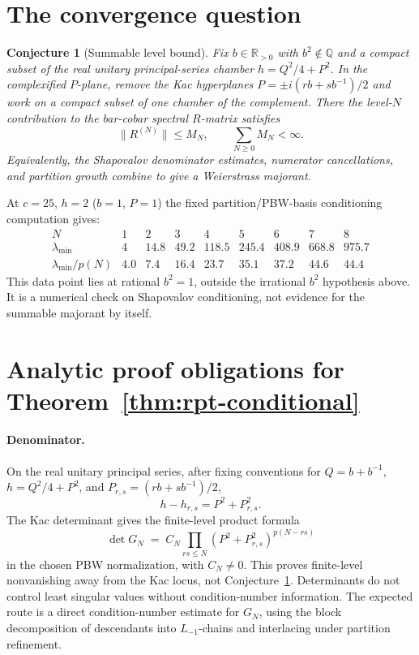 \documentclass[11pt]{amsart}
\newtheorem{conjecture}[theorem]{Conjecture}
\theoremstyle{definition}
\theoremstyle{remark}
\begin{document}
\section{The convergence question}

\begin{conjecture}[Summable level bound]
\label{conj:shapovalov-growth}
Fix $b\in\mathbb{R}_{>0}$ with $b^2\notin\mathbb{Q}$ and a compact
subset of the real unitary principal-series chamber
$h = Q^2/4 + P^2$.  In the complexified $P$-plane, remove the Kac
hyperplanes $P=\pm i(rb+s b^{-1})/2$ and work on a compact subset of
one chamber of the complement.  There the level-$N$ contribution to
the bar-cobar spectral $R$-matrix satisfies
\[
  \|R^{(N)}\| \le M_N,
  \qquad \sum_{N\ge0} M_N < \infty .
\]
Equivalently, the Shapovalov denominator estimates, numerator
cancellations, and partition growth combine to give a Weierstrass
majorant.
\end{conjecture}

At $c = 25$, $h = 2$ ($b = 1$, $P = 1$) the fixed partition/PBW-basis
conditioning computation gives:
\[
\begin{array}{c|cccccccc}
N & 1 & 2 & 3 & 4 & 5 & 6 & 7 & 8 \\
\hline
\lambda_{\min} & 4 & 14.8 & 49.2 & 118.5 & 245.4 & 408.9 & 668.8 &
975.7 \\
\lambda_{\min}/p(N) & 4.0 & 7.4 & 16.4 & 23.7 & 35.1 & 37.2 & 44.6 &
44.4
\end{array}
\]
This data point lies at rational $b^2=1$, outside the irrational
$b^2$ hypothesis above.  It is a numerical check on Shapovalov
conditioning, not evidence for the summable majorant by itself.

\section{Analytic proof obligations for Theorem~\ref{thm:rpt-conditional}}

\paragraph{Denominator.}
On the real unitary principal series, after fixing conventions for
$Q=b+b^{-1}$, $h=Q^2/4+P^2$, and
$P_{r,s}=(rb+s b^{-1})/2$,
\[
  h-h_{r,s}=P^2+P_{r,s}^2 .
\]
The Kac determinant gives the finite-level product formula
\cite{KacRaina,FeiginFuchs90}
\[
\det G_N
\;=\;
C_N\prod_{rs \le N}(P^2 + P_{r,s}^2)^{p(N-rs)}
\]
in the chosen PBW normalization, with $C_N\ne0$. This proves
finite-level nonvanishing away from the Kac locus, not
Conjecture~\ref{conj:shapovalov-growth}.  Determinants do not control
least singular values without condition-number information.  The
expected route is a direct condition-number estimate for $G_N$, using
the block decomposition of descendants into $L_{-1}$-chains and
interlacing under partition refinement.
\end{document}
